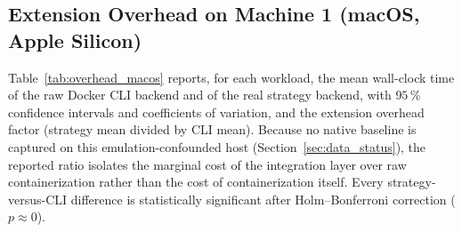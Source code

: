 \subsection{Extension Overhead on Machine 1 (macOS, Apple Silicon)}
\label{subsec:overhead_macos_sub}
Table~\ref{tab:overhead_macos} reports, for each workload, the mean wall-clock time of the raw Docker CLI backend and of the real strategy backend, with $95\,\%$ confidence intervals and coefficients of variation, and the extension overhead factor (strategy mean divided by CLI mean). Because no native baseline is captured on this emulation-confounded host (Section~\ref{sec:data_status}), the reported ratio isolates the marginal cost of the integration layer over raw containerization rather than the cost of containerization itself. Every strategy-versus-CLI difference is statistically significant after Holm--Bonferroni correction ($p \approx 0$).

